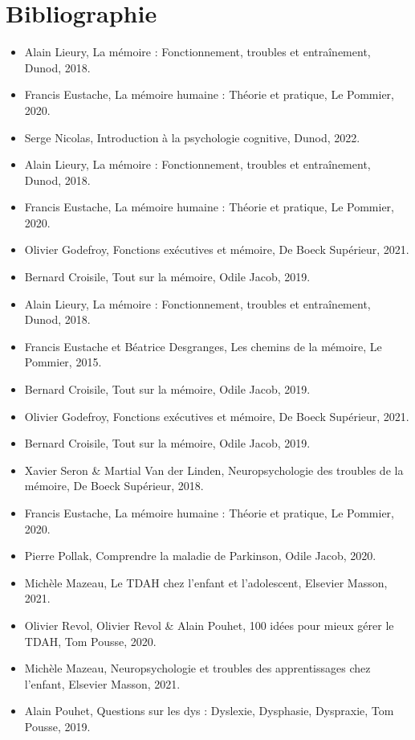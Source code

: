 \documentclass[11pt,a4paper]{report}
\begin{document}
\chapter*{Bibliographie}
\begin{itemize}
    \item Alain Lieury, La mémoire : Fonctionnement, troubles et entraînement, Dunod, 2018.
    \item Francis Eustache, La mémoire humaine : Théorie et pratique, Le Pommier, 2020.
    \item Serge Nicolas, Introduction à la psychologie cognitive, Dunod, 2022.
    
    \item Alain Lieury, La mémoire : Fonctionnement, troubles et entraînement, Dunod, 2018.
    \item Francis Eustache, La mémoire humaine : Théorie et pratique, Le Pommier, 2020.
    \item Olivier Godefroy, Fonctions exécutives et mémoire, De Boeck Supérieur, 2021.
    \item Bernard Croisile, Tout sur la mémoire, Odile Jacob, 2019.
    
    \item Alain Lieury, La mémoire : Fonctionnement, troubles et entraînement, Dunod, 2018.
    \item Francis Eustache et Béatrice Desgranges, Les chemins de la mémoire, Le Pommier, 2015.
    \item Bernard Croisile, Tout sur la mémoire, Odile Jacob, 2019.
    \item Olivier Godefroy, Fonctions exécutives et mémoire, De Boeck Supérieur, 2021.
    
    \item Bernard Croisile, Tout sur la mémoire, Odile Jacob, 2019.
    \item Xavier Seron \& Martial Van der Linden, Neuropsychologie des troubles de la mémoire, De Boeck Supérieur, 2018.
    \item Francis Eustache, La mémoire humaine : Théorie et pratique, Le Pommier, 2020.
    \item Pierre Pollak, Comprendre la maladie de Parkinson, Odile Jacob, 2020.
    
    \item Michèle Mazeau, Le TDAH chez l'enfant et l'adolescent, Elsevier Masson, 2021.
    \item Olivier Revol, Olivier Revol \& Alain Pouhet, 100 idées pour mieux gérer le TDAH, Tom Pousse, 2020.
    \item Michèle Mazeau, Neuropsychologie et troubles des apprentissages chez l'enfant, Elsevier Masson, 2021.
    \item Alain Pouhet, Questions sur les dys : Dyslexie, Dysphasie, Dyspraxie, Tom Pousse, 2019.
    

\end{itemize}
\end{document}
